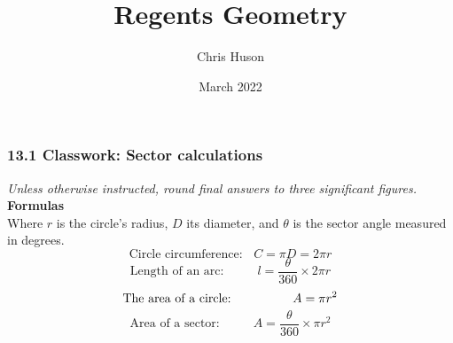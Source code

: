 \documentclass[12pt, twoside]{article}
\title{Regents Geometry}
\author{Chris Huson}
\date{March 2022}
\begin{document}
\subsubsection*{13.1 Classwork: Sector calculations}
\emph{Unless otherwise instructed, round final answers to three significant figures.}\\
\textbf{Formulas}\\
Where $r$ is the circle's radius, $D$ its diameter, and $\theta$ is the sector angle measured in degrees.
  \[\text{Circle circumference: } \;\; C=\pi D = 2\pi r\]
  \[\text{Length of an arc: } \hspace{1cm} l=\frac{\theta}{360} \times 2\pi r\]
  \[\text{The area of a circle: } \hspace{1.6cm}  A=\pi r^2\]
  \[\text{Area of a sector: } \hspace{1cm}  A=\frac{\theta}{360} \times \pi r^2\]
  \vspace{0.25cm}
\end{document}
